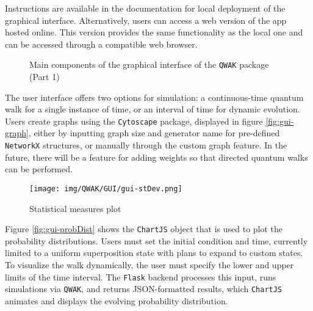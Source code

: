 \documentclass[main.tex]{subfiles}
\begin{document}
Instructions are available in the documentation for local deployment of the graphical interface.
Alternatively, users can access a web version of the app hosted online. This
version provides the same functionality as the local one and can be
accessed through a compatible web browser.\par
\begin{figure}[!h]
  \begin{minipage}{.5\linewidth}
    \centering
  \end{minipage}
  \begin{minipage}{.5\linewidth}
    \centering
  \end{minipage}
  \caption{Main components of the graphical interface of the \texttt{QWAK} package (Part 1)}
  \label{fig:main1}
\end{figure}

The user interface offers two options for simulation: a continuous-time quantum
walk for a single instance of time, or an interval of time for dynamic
evolution. Users create graphs using the \texttt{Cytoscape} package, displayed
in figure \ref{fig:gui-graph}, either by inputting graph size and generator
name for pre-defined \texttt{NetworkX} structures, or manually through the
custom graph feature. In the future, there will be a feature for adding weights
so that directed quantum walks can be performed.\par
\begin{figure}[!h]
  \centering
  \texttt{[image: img/QWAK/GUI/gui-stDev.png]}
  \caption{Statistical measures plot}
  \label{fig:gui-stDev}
\end{figure}

Figure \ref{fig:gui-probDist} shows the \texttt{ChartJS} object that is used to
plot the probability distributions. Users must set the initial condition and
time, currently limited to a uniform superposition state with plans to expand
to custom states. To visualize the walk dynamically, the user must specify the
lower and upper limits of the time interval. The \texttt{Flask} backend
processes this input, runs simulations via \texttt{QWAK}, and returns
JSON-formatted results, which \texttt{ChartJS} animates and displays the
evolving probability distribution.\par
\end{document}
